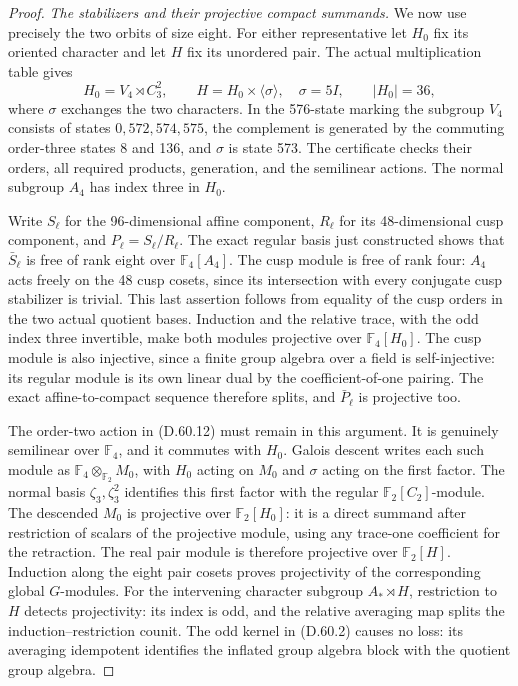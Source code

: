 \begin{proof}
\emph{The stabilizers and their projective compact summands.}
We now use precisely the two orbits of
size eight. For either representative let
\(H_0\) fix its oriented character and
let \(H\) fix its unordered pair.
The actual multiplication table gives
\[
 H_0=V_4\rtimes C_3^2,\qquad
 H=H_0\times\langle\sigma\rangle,
 \quad\sigma=5I,\qquad |H_0|=36,
 \tag{D.60.12}
\]
where \(\sigma\) exchanges the two
characters. In the 576-state marking
the subgroup \(V_4\) consists of states
\(0,572,574,575\), the complement is
generated by the commuting order-three
states 8 and 136, and \(\sigma\) is
state 573. The certificate checks their
orders, all required products, generation,
and the semilinear actions. The normal
subgroup \(A_4\) has index three in
\(H_0\).

Write \(S_\ell\) for the 96-dimensional
affine component, \(R_\ell\) for its
48-dimensional cusp component, and
\(P_\ell=S_\ell/R_\ell\).
The exact regular basis just constructed
shows that \(\bar S_\ell\) is free of
rank eight over \(\mathbb F_4[A_4]\).
The cusp module is free of rank four:
\(A_4\) acts freely on the 48 cusp
cosets, since its intersection with
every conjugate cusp stabilizer is
trivial. This last assertion follows
from equality of the cusp orders in
the two actual quotient bases.
Induction and the relative trace, with
the odd index three invertible, make
both modules projective over
\(\mathbb F_4[H_0]\). The cusp module
is also injective, since a finite group
algebra over a field is self-injective:
its regular module is its own linear
dual by the coefficient-of-one pairing.
The exact affine-to-compact sequence
therefore splits, and \(\bar P_\ell\)
is projective too.

The order-two action in (D.60.12) must
remain in this argument. It is genuinely
semilinear over \(\mathbb F_4\), and it
commutes with \(H_0\). Galois descent
writes each such module as
\(\mathbb F_4\otimes_{\mathbb F_2}M_0\),
with \(H_0\) acting on \(M_0\) and
\(\sigma\) acting on the first factor.
The normal basis \(\zeta_3,\zeta_3^2\)
identifies this first factor with the
regular \(\mathbb F_2[C_2]\)-module.
The descended \(M_0\) is projective
over \(\mathbb F_2[H_0]\): it is a
direct summand after restriction of
scalars of the projective module, using
any trace-one coefficient for the
retraction. The real pair module is
therefore projective over
\(\mathbb F_2[H]\). Induction along
the eight pair cosets proves projectivity
of the corresponding global \(G\)-modules.
For the intervening character subgroup
\(A_*\rtimes H\), restriction to \(H\)
detects projectivity: its index is odd,
and the relative averaging map splits
the induction--restriction counit.
The odd kernel in (D.60.2) causes no
loss: its averaging idempotent identifies
the inflated group algebra block with
the quotient group algebra.


\end{proof}
